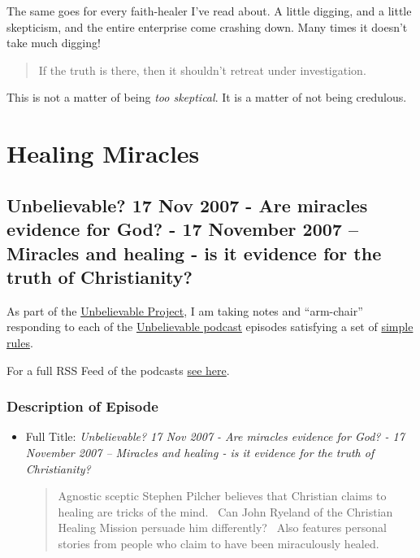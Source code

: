 The same goes for every faith-healer I've read about. A little digging,
and a little skepticism, and the entire enterprise come crashing down.
Many times it doesn't take much digging!

\begin{quote}
If the truth is there, then it shouldn't retreat under investigation.
\end{quote}

This is not a matter of being \emph{too skeptical}. It is a matter of
not being credulous.



\section{Healing Miracles}


\subsection{Unbelievable? 17 Nov 2007 - Are miracles evidence for God? -
17 November 2007 -- Miracles and healing - is it evidence for the truth
of
Christianity?}\label{unbelievable-17-nov-2007-are-miracles-evidence-for-god-17-november-2007-miracles-and-healing-is-it-evidence-for-the-truth-of-christianity}

As part of the
\href{https://brianblais.wordpress.com/2013/02/27/unbelievable-project-a-non-believers-armchair-perspective-on-six-years-of-christian-debates/}{Unbelievable
Project}, I am taking notes and ``arm-chair'' responding to each of the
\href{http://www.premierradio.org.uk/shows/saturday/unbelievable.aspx}{Unbelievable
podcast} episodes satisfying a set of
\href{https://brianblais.wordpress.com/2013/02/27/unbelievable-project-a-non-believers-armchair-perspective-on-six-years-of-christian-debates/}{simple
rules}.

For a full RSS Feed of the podcasts
\href{http://ondemand.premier.org.uk/unbelievable/AudioFeed.aspx}{see
here}.

\subsubsection{Description of Episode}\label{description-of-episode}

\begin{itemize}
\item
  Full Title: \emph{Unbelievable? 17 Nov 2007 - Are miracles evidence
  for God? - 17 November 2007 -- Miracles and healing - is it evidence
  for the truth of Christianity?}

  \begin{quote}
  Agnostic sceptic Stephen Pilcher believes that Christian claims to
  healing are tricks of the mind.~ Can John Ryeland of the Christian
  Healing Mission persuade him differently?~ Also features personal
  stories from people who claim to have been miraculously healed.
  \end{quote}
\end{itemize}

